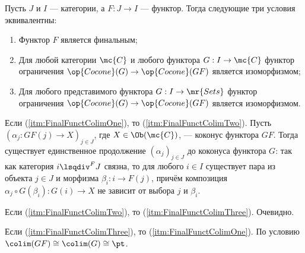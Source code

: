 \documentclass[
	extrafontsizes,
	11pt,
	hyphens,
]{memoir}
\begin{document}
\begin{theorem}
Пусть \(J\) и \(I\) --- категории, а \(F : J \to I\) --- функтор.%
\label{thm:FinalFunctColim}
Тогда следующие три условия эквивалентны:
\begin{enumerate}[
	font=\upshape,
	label=\asbuk*),
	ref=\asbuk*,
	]

\item \label{itm:FinalFunctColimOne}
Функтор \(F\) является финальным;

\item \label{itm:FinalFunctColimTwo}
Для любой категории \(\mc{C}\) и любого функтора \(G : I \to \mc{C}\) функтор ограничения \(\op{Cocone}(G) \to \op{Cocone}(GF)\) является изоморфизмом;

\item \label{itm:FinalFunctColimThree}
Для любого представимого функтора \(G : I \to \mr{Sets}\) функтор ограничения \(\op{Cocone}(G) \to \op{Cocone}(GF)\) является изоморфизмом.

\end{enumerate}
\end{theorem}

\begin{proofparts}

\item[Если (\ref{itm:FinalFunctColimOne}), то (\ref{itm:FinalFunctColimTwo}).]
Пусть \((\alpha_j : GF(j) \to X)_{j \in J}\), где \(X \in \Ob(\mc{C})\), --- коконус функтора \(GF\).
Тогда существует единственное продолжение \((\alpha_j)_{j \in J}\) до коконуса функтора \(G\):
так как категория \(i \lsqdiv^F J\) связна, то
для любого \(i \in I\) существует пара из объекта \(j \in J\) и морфизма \(\beta_i : i \to F(j)\), причём композиция \(\alpha_j \circ G(\beta_i) : G(i) \to X\) не зависит от выбора \(j\) и \(\beta_i\).

\item[Если (\ref{itm:FinalFunctColimTwo}), то (\ref{itm:FinalFunctColimThree}).]
Очевидно.


\item[Если (\ref{itm:FinalFunctColimThree}), то (\ref{itm:FinalFunctColimOne}).]
По условию \(\colim(G F) \cong \colim(G) \cong \pt\).
\qedhere

\end{proofparts}
\end{document}
